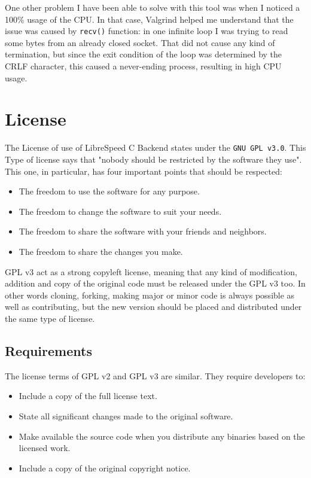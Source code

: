 \documentclass{article}
\begin{document}
One other problem I have been able to solve with this tool was when I noticed a 100\% usage of the CPU. In that case, Valgrind helped me understand that the issue was caused by \texttt{recv()} function: in one infinite loop I was trying to read some bytes from an already closed socket. That did not cause any kind of termination, but since the exit condition of the loop was determined by the CRLF character, this caused a never-ending process, resulting in high CPU usage.

\newpage
\section{License}
The License of use of LibreSpeed C Backend states under the \texttt{GNU GPL v3.0}. This Type of license says that "nobody should be restricted by the software they use". This one, in particular, has four important points that should be respected:
\begin{itemize}
\item The freedom to use the software for any purpose.
\item The freedom to change the software to suit your needs.
\item The freedom to share the software with your friends and neighbors.
\item The freedom to share the changes you make.
\end{itemize}
GPL v3 act as a strong copyleft license, meaning that any kind of modification, addition and copy of the original code must be released under the GPL v3 too. In other words cloning, forking, making major or minor code is always possible as well as contributing, but the new version should be placed and distributed under the same type of license.

\subsection{Requirements}
The license terms of GPL v2 and GPL v3 are similar. They require developers to:
\begin{itemize}
\item Include a copy of the full license text.
\item State all significant changes made to the original software.
\item Make available the source code when you distribute any binaries based on the licensed work.
\item Include a copy of the original copyright notice.
\end{itemize}
\end{document}
